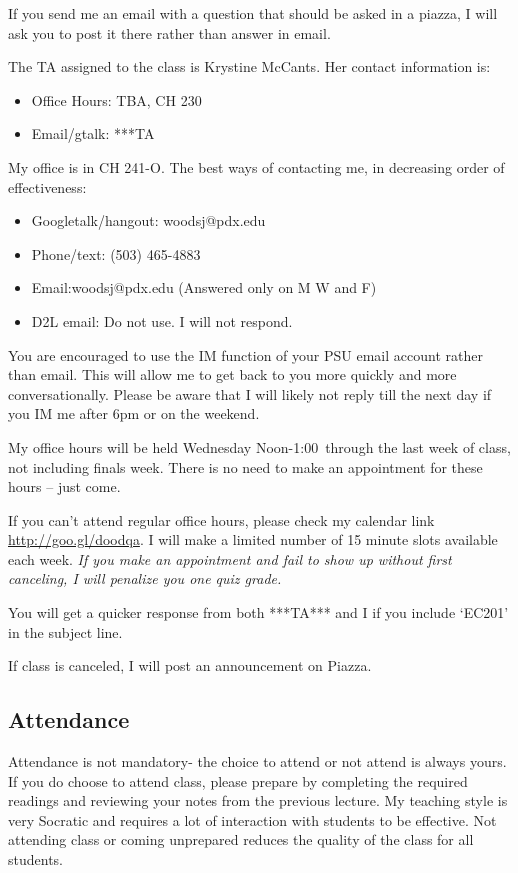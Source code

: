 \documentclass[letterpaper,10pt]{article}
\newcommand{\Office}{Wednesday Noon-1:00}
\begin{document}
If you send me an email with a question that should be asked in a piazza, I
will ask you to post it there rather than answer in email.

The TA assigned to the class is Krystine McCants. 
 Her contact information is:
 \begin{itemize}
 \item Office Hours: TBA, CH 230
 \item Email/gtalk: ***TA
 \end{itemize}


My office is in CH 241-O.  The best ways of contacting me, in
decreasing order of effectiveness:
\begin{itemize}
\item Googletalk/hangout: woodsj@pdx.edu
\item Phone/text: (503) 465-4883
\item Email:woodsj@pdx.edu (Answered only on M W and F)
\item D2L email: Do not use.  I will not respond.
\end{itemize}

You are encouraged to use the IM function of your PSU email account rather than email. This will allow me to get back to you more quickly and more conversationally. Please be aware that I will likely not reply till the next day if you IM me after 6pm or on the weekend.  

My office hours will be held \Office ~through the last week of class, not including finals week. There is no need to make an appointment for these hours -- just come.

If you can't attend regular office hours, please check my calendar link \url{http://goo.gl/doodqa}. I will make a limited number of 15 minute slots available each week. \emph{If you make an appointment and fail to show up without first canceling, I will penalize you one quiz grade.}  


You will get a quicker response from both ***TA*** and I if you include `EC201' in the subject line.


If class is canceled, I will post an announcement on Piazza.

\subsection{Attendance}

Attendance is not mandatory- the choice to attend or not attend is
always yours. If you do choose to attend class, please prepare by
completing the required readings and reviewing your notes from the
previous lecture. My teaching style is very Socratic and requires a
lot of interaction with students to be effective. Not attending class
or coming unprepared reduces the quality of the class for all
students.
\end{document}
